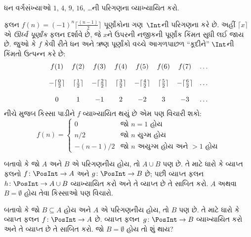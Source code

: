 \begin{prob}
ધન વર્ગસંખ્યાઓ $1$, $4$, $9$, $16$, \dots{}ની
પરિગણના વ્યાખ્યાયિત કરો.
\end{prob}

\begin{ex}
ફલન $f(n) = (-1)^{n} \lceil \frac{(n-1)}{2}\rceil$
પૂર્ણાંકોના ગણ~$\Int$ની પરિગણના કરે છે. અહીં
$\lceil x \rceil$ એ \emph{ઊર્ધ્વ પૂર્ણાંક} ફલન
દર્શાવે છે, જે $x$ને ઉપરની નજીકની પૂર્ણાંક કિંમત
સુધી લઈ જાય છે. જુઓ કે $f$ કેવી રીતે ધન અને ઋણ
પૂર્ણાંકો વચ્ચે આગળપાછળ “કૂદીને” $\Int$ની કિંમતો
ઉત્પન્ન કરે છે:
\[
\begin{array}{c c c c c c c c}
f(1) & f(2) & f(3) & f(4) & f(5) & f(6) & f(7) & \dots \\ \\
- \lceil \tfrac{0}{2} \rceil & \lceil \tfrac{1}{2}\rceil & - \lceil \tfrac{2}{2} \rceil & \lceil \tfrac{3}{2} \rceil & - \lceil \tfrac{4}{2} \rceil  & \lceil \tfrac{5}{2}
\rceil & - \lceil \tfrac{6}{2} \rceil & \dots \\ \\
0 & 1 & -1 & 2 & -2 & 3 & -3 & \dots
\end{array}
\]
નીચે મુજબ કિસ્સા પાડીને $f$ વ્યાખ્યાયિત થયું છે
એમ પણ વિચારી શકો:
\[
f(n) = \begin{cases}
  0 & \text{જો $n = 1$ હોય}\\
  n/2 & \text{જો $n$ યુગ્મ હોય}\\
  -(n-1)/2 & \text{જો $n$ અયુગ્મ હોય અને $>1$ હોય}
  \end{cases}
\]
\end{ex}

\begin{prob}
બતાવો કે જો $A$ અને $B$ એ પરિગણનીય હોય,
તો $A \cup B$ પણ છે. તે માટે ધારો કે
વ્યાપ્ત ફલનો $f\colon \PosInt \to
A$ અને $g\colon \PosInt \to B$ છે; પછી
વ્યાપ્ત ફલન~$h\colon \PosInt \to A \cup B$
વ્યાખ્યાયિત કરો અને તે વ્યાપ્ત છે તે સાબિત કરો.
$A$ અથવા~$B = \emptyset$ હોય તેવા કિસ્સાઓ પણ વિચારો.
\end{prob}

\begin{prob}
બતાવો કે જો $B \subseteq A$ હોય અને $A$ એ
પરિગણનીય હોય, તો $B$ પણ છે. તે માટે ધારો કે
વ્યાપ્ત ફલન $f\colon \PosInt \to
A$ છે. વ્યાપ્ત ફલન~$g\colon \PosInt \to B$
વ્યાખ્યાયિત કરો અને તે વ્યાપ્ત છે તે સાબિત કરો.
જો $B = \emptyset$ હોય તો શું થાય?
\end{prob}

